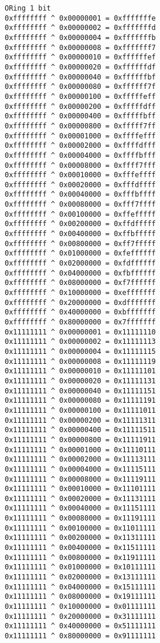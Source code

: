 \documentclass[11pt]{article}
\begin{document}
\begin{verbatim}
ORing 1 bit
0xffffffff ^ 0x00000001 = 0xfffffffe
0xffffffff ^ 0x00000002 = 0xfffffffd
0xffffffff ^ 0x00000004 = 0xfffffffb
0xffffffff ^ 0x00000008 = 0xfffffff7
0xffffffff ^ 0x00000010 = 0xffffffef
0xffffffff ^ 0x00000020 = 0xffffffdf
0xffffffff ^ 0x00000040 = 0xffffffbf
0xffffffff ^ 0x00000080 = 0xffffff7f
0xffffffff ^ 0x00000100 = 0xfffffeff
0xffffffff ^ 0x00000200 = 0xfffffdff
0xffffffff ^ 0x00000400 = 0xfffffbff
0xffffffff ^ 0x00000800 = 0xfffff7ff
0xffffffff ^ 0x00001000 = 0xffffefff
0xffffffff ^ 0x00002000 = 0xffffdfff
0xffffffff ^ 0x00004000 = 0xffffbfff
0xffffffff ^ 0x00008000 = 0xffff7fff
0xffffffff ^ 0x00010000 = 0xfffeffff
0xffffffff ^ 0x00020000 = 0xfffdffff
0xffffffff ^ 0x00040000 = 0xfffbffff
0xffffffff ^ 0x00080000 = 0xfff7ffff
0xffffffff ^ 0x00100000 = 0xffefffff
0xffffffff ^ 0x00200000 = 0xffdfffff
0xffffffff ^ 0x00400000 = 0xffbfffff
0xffffffff ^ 0x00800000 = 0xff7fffff
0xffffffff ^ 0x01000000 = 0xfeffffff
0xffffffff ^ 0x02000000 = 0xfdffffff
0xffffffff ^ 0x04000000 = 0xfbffffff
0xffffffff ^ 0x08000000 = 0xf7ffffff
0xffffffff ^ 0x10000000 = 0xefffffff
0xffffffff ^ 0x20000000 = 0xdfffffff
0xffffffff ^ 0x40000000 = 0xbfffffff
0xffffffff ^ 0x80000000 = 0x7fffffff
0x11111111 ^ 0x00000001 = 0x11111110
0x11111111 ^ 0x00000002 = 0x11111113
0x11111111 ^ 0x00000004 = 0x11111115
0x11111111 ^ 0x00000008 = 0x11111119
0x11111111 ^ 0x00000010 = 0x11111101
0x11111111 ^ 0x00000020 = 0x11111131
0x11111111 ^ 0x00000040 = 0x11111151
0x11111111 ^ 0x00000080 = 0x11111191
0x11111111 ^ 0x00000100 = 0x11111011
0x11111111 ^ 0x00000200 = 0x11111311
0x11111111 ^ 0x00000400 = 0x11111511
0x11111111 ^ 0x00000800 = 0x11111911
0x11111111 ^ 0x00001000 = 0x11110111
0x11111111 ^ 0x00002000 = 0x11113111
0x11111111 ^ 0x00004000 = 0x11115111
0x11111111 ^ 0x00008000 = 0x11119111
0x11111111 ^ 0x00010000 = 0x11101111
0x11111111 ^ 0x00020000 = 0x11131111
0x11111111 ^ 0x00040000 = 0x11151111
0x11111111 ^ 0x00080000 = 0x11191111
0x11111111 ^ 0x00100000 = 0x11011111
0x11111111 ^ 0x00200000 = 0x11311111
0x11111111 ^ 0x00400000 = 0x11511111
0x11111111 ^ 0x00800000 = 0x11911111
0x11111111 ^ 0x01000000 = 0x10111111
0x11111111 ^ 0x02000000 = 0x13111111
0x11111111 ^ 0x04000000 = 0x15111111
0x11111111 ^ 0x08000000 = 0x19111111
0x11111111 ^ 0x10000000 = 0x01111111
0x11111111 ^ 0x20000000 = 0x31111111
0x11111111 ^ 0x40000000 = 0x51111111
0x11111111 ^ 0x80000000 = 0x91111111
\end{verbatim}
\end{document}
